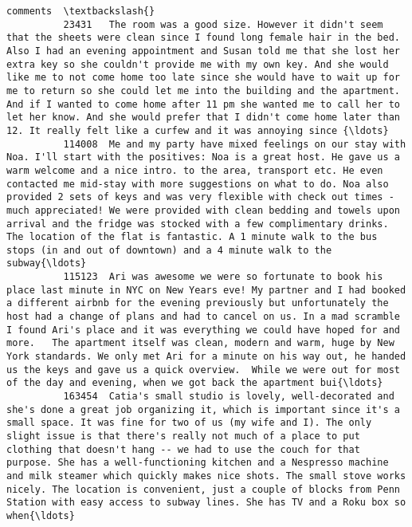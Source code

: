 \documentclass[11pt]{article}
\begin{document}
\begin{Verbatim}[commandchars=\\\{\}]
                                                                                                                                                                                                                                                                                                                                                                                                                                                                                                                                                                                                                                 comments  \textbackslash{}
          23431   The room was a good size. However it didn't seem that the sheets were clean since I found long female hair in the bed. Also I had an evening appointment and Susan told me that she lost her extra key so she couldn't provide me with my own key. And she would like me to not come home too late since she would have to wait up for me to return so she could let me into the building and the apartment. And if I wanted to come home after 11 pm she wanted me to call her to let her know. And she would prefer that I didn't come home later than 12. It really felt like a curfew and it was annoying since {\ldots}   
          114008  Me and my party have mixed feelings on our stay with Noa. I'll start with the positives: Noa is a great host. He gave us a warm welcome and a nice intro. to the area, transport etc. He even contacted me mid-stay with more suggestions on what to do. Noa also provided 2 sets of keys and was very flexible with check out times - much appreciated! We were provided with clean bedding and towels upon arrival and the fridge was stocked with a few complimentary drinks. The location of the flat is fantastic. A 1 minute walk to the bus stops (in and out of downtown) and a 4 minute walk to the subway{\ldots}   
          115123  Ari was awesome we were so fortunate to book his place last minute in NYC on New Years eve! My partner and I had booked a different airbnb for the evening previously but unfortunately the host had a change of plans and had to cancel on us. In a mad scramble I found Ari's place and it was everything we could have hoped for and more.   The apartment itself was clean, modern and warm, huge by New York standards. We only met Ari for a minute on his way out, he handed us the keys and gave us a quick overview.  While we were out for most of the day and evening, when we got back the apartment bui{\ldots}   
          163454  Catia's small studio is lovely, well-decorated and she's done a great job organizing it, which is important since it's a small space. It was fine for two of us (my wife and I). The only slight issue is that there's really not much of a place to put clothing that doesn't hang -- we had to use the couch for that purpose. She has a well-functioning kitchen and a Nespresso machine and milk steamer which quickly makes nice shots. The small stove works nicely. The location is convenient, just a couple of blocks from Penn Station with easy access to subway lines. She has TV and a Roku box so when{\ldots}   

\end{Verbatim}
\end{document}

